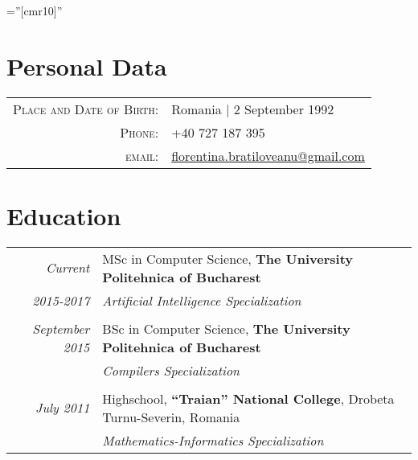 \documentclass[a4paper,10pt]{article} %
\begin{document}
\pagestyle{empty} %

\font\fb=''[cmr10]'' %

\par{\bigskip\par} %

\section{Personal Data}

\begin{tabular}{rl}
\textsc{Place and Date of Birth:} & Romania  | 2 September 1992 \\
\textsc{Phone:} & +40 727 187 395\\
\textsc{email:} & \href{mailto:florentina.bratiloveanu@gmail.com}{florentina.bratiloveanu@gmail.com}
\end{tabular}


\section{Education}

\begin{tabular}{rl}	
\emph{Current} & MSc in Computer Science, \textbf{The University Politehnica of Bucharest}\\
\emph{2015-2017} & \textit{Artificial Intelligence Specialization}\\
&\\
\emph{September 2015} & BSc in Computer Science, \textbf{The University Politehnica of Bucharest}\\
& \textit{Compilers Specialization}\\
&\\

\emph{July 2011} & Highschool, \textbf{“Traian” National College}, Drobeta Turnu-Severin, Romania\\
& \textit{Mathematics-Informatics Specialization}\\
\end{tabular}
\end{document}
